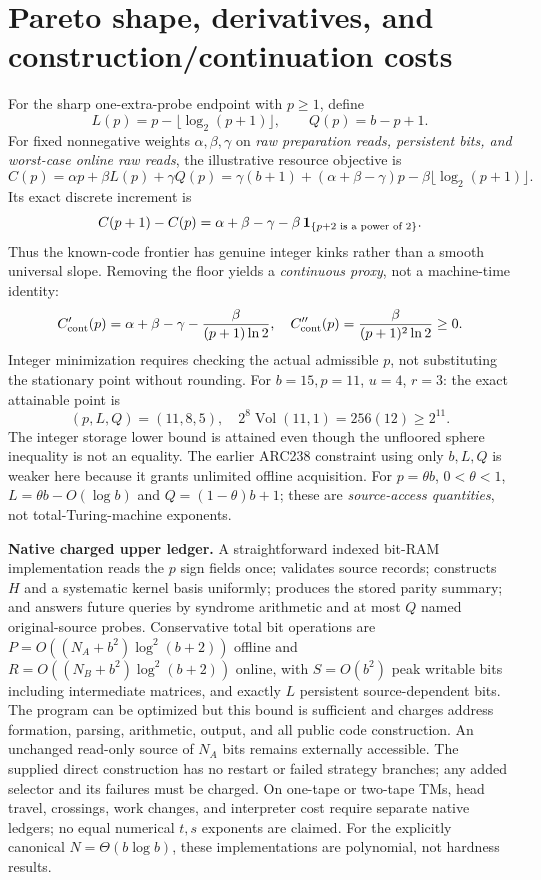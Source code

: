 \documentclass[10pt]{article}
\newcommand{\V}{\operatorname{Vol}}
\begin{document}
\section{Pareto shape, derivatives, and construction/continuation costs}
For the sharp one-extra-probe endpoint with $p\ge1$, define
\[
 L(p)=p-\lfloor\log_2(p+1)\rfloor,\qquad Q(p)=b-p+1.
\]
For fixed nonnegative weights $\alpha,\beta,\gamma$ on \emph{raw preparation reads, persistent bits, and worst-case online raw reads}, the illustrative resource objective is
\[
 C(p)=\alpha p+\beta L(p)+\gamma Q(p)
 =\gamma(b+1)+(\alpha+\beta-\gamma)p-\beta\lfloor\log_2(p+1)\rfloor.
\]
Its exact discrete increment is
\[
 C(p+1)-C(p)=\alpha+\beta-\gamma
 -\beta\,{\bf1}_{\{p+2\text{ is a power of }2\}}.
\]
Thus the known-code frontier has genuine integer kinks rather than a smooth universal slope. Removing the floor yields a \emph{continuous proxy}, not a machine-time identity:
\[
 C_{\rm cont}'(p)=\alpha+\beta-\gamma-\frac{\beta}{(p+1)\ln2},\quad
 C_{\rm cont}''(p)=\frac{\beta}{(p+1)^2\ln2}\ge0.
\]
Integer minimization requires checking the actual admissible $p$, not substituting the stationary point without rounding. For $b=15,p=11$, $u=4$, $r=3$: the exact attainable point is
\[
 \boxed{(p,L,Q)=(11,8,5)},\quad
 2^8\V(11,1)=256(12)\ge2^{11}.
\]
The integer storage lower bound is attained even though the unfloored sphere inequality is not an equality. The earlier ARC238 constraint using only $b,L,Q$ is weaker here because it grants unlimited offline acquisition. For $p=\theta b$, $0<\theta<1$, $L=\theta b-O(\log b)$ and $Q=(1-\theta)b+1$; these are \emph{source-access quantities}, not total-Turing-machine exponents.

\noindent\textbf{Native charged upper ledger.} A straightforward indexed bit-RAM implementation reads the $p$ sign fields once; validates source records; constructs $H$ and a systematic kernel basis uniformly; produces the stored parity summary; and answers future queries by syndrome arithmetic and at most $Q$ named original-source probes. Conservative total bit operations are $P=O((N_A+b^2)\log^2(b+2))$ offline and $R=O((N_B+b^2)\log^2(b+2))$ online, with $S=O(b^2)$ peak writable bits including intermediate matrices, and exactly $L$ persistent source-dependent bits. The program can be optimized but this bound is sufficient and charges address formation, parsing, arithmetic, output, and all public code construction. An unchanged read-only source of $N_A$ bits remains externally accessible. The supplied direct construction has no restart or failed strategy branches; any added selector and its failures must be charged. On one-tape or two-tape TMs, head travel, crossings, work changes, and interpreter cost require separate native ledgers; no equal numerical $t,s$ exponents are claimed. For the explicitly canonical $N=\Theta(b\log b)$, these implementations are polynomial, not hardness results.
\end{document}
